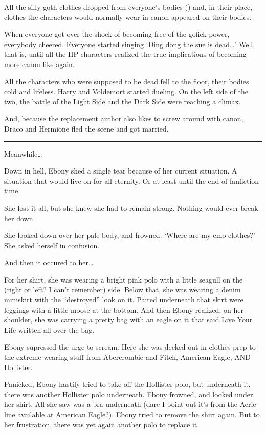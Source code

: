 All the silly goth clothes dropped from everyone's bodies () and, in their place, clothes the characters would normally wear in canon appeared on their bodies.

\begin{sloppypar}
    When everyone got over the shock of becoming free of the gofick power, everybody cheered. Everyone started singing \enquote*{Ding dong the sue is dead\ldots{}} Well, that is, until all the HP characters realized the true implications of becoming more canon like again.
\end{sloppypar}

All the characters who were supposed to be dead fell to the floor, their bodies cold and lifeless. Harry and Voldemort started dueling. On the left side of the two, the battle of the Light Side and the Dark Side were reaching a climax.

And, because the replacement author also likes to screw around with canon, Draco and Hermione fled the scene and got married.

\rule{1in}{0.4pt}

Meanwhile\ldots{}

Down in hell, Ebony shed a single tear because of her current situation. A situation that would live on for all eternity. Or at least until the end of fanfiction time.

She lost it all, but she knew she had to remain strong. Nothing would ever break her down.

She looked down over her pale body, and frowned. \enquote*{Where are my emo clothes?} She asked herself in confusion.

And then it occured to her\ldots{}

For her shirt, she was wearing a bright pink polo with a little seagull on the (right or left? I can't remember) side. Below that, she was wearing a denim miniskirt with the \enquote{destroyed} look on it. Paired underneath that skirt were leggings with a little moose at the bottom. And then Ebony realized, on her shoulder, she was carrying a pretty bag with an eagle on it that said Live Your Life written all over the bag.

Ebony supressed the urge to scream. Here she was decked out in clothes prep to the extreme wearing stuff from Abercrombie and Fitch, American Eagle, AND Hollister.

\begin{sloppypar}
    Panicked, Ebony hastily tried to take off the Hollister polo, but underneath it, there was another Hollister polo underneath. Ebony frowned, and looked under her shirt. All she saw was a bra underneath (dare I point out it's from the Aerie line available at American Eagle?). Ebony tried to remove the shirt again. But to her frustration, there was yet again another polo to replace it.
\end{sloppypar}

